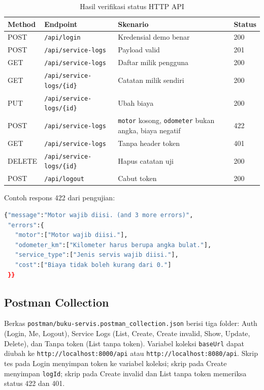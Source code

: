 \documentclass[12pt,a4paper,oneside]{book}
\begin{document}
\begin{table}[H]
\centering
\caption{Hasil verifikasi status HTTP API}
\label{tab:hasilapi}
\begin{tabularx}{\textwidth}{@{}l l X l@{}}
\toprule
\textbf{Method} & \textbf{Endpoint} & \textbf{Skenario} & \textbf{Status} \\
\midrule
POST & \texttt{/api/login} & Kredensial demo benar & 200 \\
POST & \texttt{/api/service-logs} & Payload valid & 201 \\
GET & \texttt{/api/service-logs} & Daftar milik pengguna & 200 \\
GET & \texttt{/api/service-logs/\{id\}} & Catatan milik sendiri & 200 \\
PUT & \texttt{/api/service-logs/\{id\}} & Ubah biaya & 200 \\
POST & \texttt{/api/service-logs} & \texttt{motor} kosong, \texttt{odometer} bukan angka, biaya negatif & 422 \\
GET & \texttt{/api/service-logs} & Tanpa header token & 401 \\
DELETE & \texttt{/api/service-logs/\{id\}} & Hapus catatan uji & 200 \\
POST & \texttt{/api/logout} & Cabut token & 200 \\
\bottomrule
\end{tabularx}
\end{table}

Contoh respons 422 dari pengujian:

\begin{lstlisting}[language=bash,caption={Contoh respons validasi 422},label={kode:422}]
{"message":"Motor wajib diisi. (and 3 more errors)",
 "errors":{
   "motor":["Motor wajib diisi."],
   "odometer_km":["Kilometer harus berupa angka bulat."],
   "service_type":["Jenis servis wajib diisi."],
   "cost":["Biaya tidak boleh kurang dari 0."]
 }}
\end{lstlisting}

\subsection{Postman Collection}

Berkas \texttt{postman/buku-servis.postman\_collection.json} berisi tiga folder:
Auth (Login, Me, Logout), Service Logs (List, Create, Create invalid, Show, Update,
Delete), dan Tanpa token (List tanpa token). Variabel koleksi \texttt{baseUrl}
dapat diubah ke \texttt{http://localhost:8000/api} atau
\texttt{http://localhost:8080/api}. Skrip tes pada Login menyimpan token ke variabel
koleksi; skrip pada Create menyimpan \texttt{logId}; skrip pada Create invalid dan
List tanpa token memeriksa status 422 dan 401.
\end{document}
